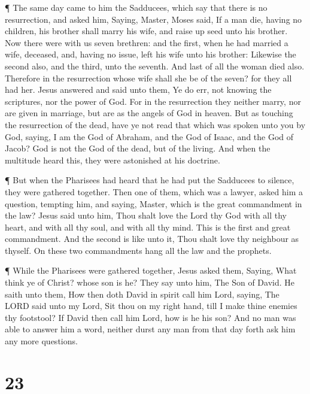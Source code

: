  ¶ The same day came to him the Sadducees, which say that
there is no resurrection, and asked him,  Saying, Master,
Moses said, If a man die, having no children, his brother shall marry
his wife, and raise up seed unto his brother.  Now there
were with us seven brethren: and the first, when he had married a wife,
deceased, and, having no issue, left his wife unto his brother:
 Likewise the second also, and the third, unto the seventh.
 And last of all the woman died also. 
Therefore in the resurrection whose wife shall she be of the seven? for
they all had her.  Jesus answered and said unto them, Ye do
err, not knowing the scriptures, nor the power of God.  For
in the resurrection they neither marry, nor are given in marriage, but
are as the angels of God in heaven.  But as touching the
resurrection of the dead, have ye not read that which was spoken unto
you by God, saying,  I am the God of Abraham, and the God
of Isaac, and the God of Jacob? God is not the God of the dead, but of
the living.  And when the multitude heard this, they were
astonished at his doctrine.

 ¶ But when the Pharisees had heard that he had put the
Sadducees to silence, they were gathered together.  Then
one of them, which was a lawyer, asked him a question, tempting him, and
saying,  Master, which is the great commandment in the law?
 Jesus said unto him, Thou shalt love the Lord thy God with
all thy heart, and with all thy soul, and with all thy mind.
 This is the first and great commandment.  And
the second is like unto it, Thou shalt love thy neighbour as thyself.
 On these two commandments hang all the law and the
prophets.

 ¶ While the Pharisees were gathered together, Jesus asked
them,  Saying, What think ye of Christ? whose son is he?
They say unto him, The Son of David.  He saith unto them,
How then doth David in spirit call him Lord, saying,  The
LORD said unto my Lord, Sit thou on my right hand, till I make thine
enemies thy footstool?  If David then call him Lord, how is
he his son?  And no man was able to answer him a word,
neither durst any man from that day forth ask him any more questions.

\hypertarget{section-22}{%
\section{23}\label{section-22}}

